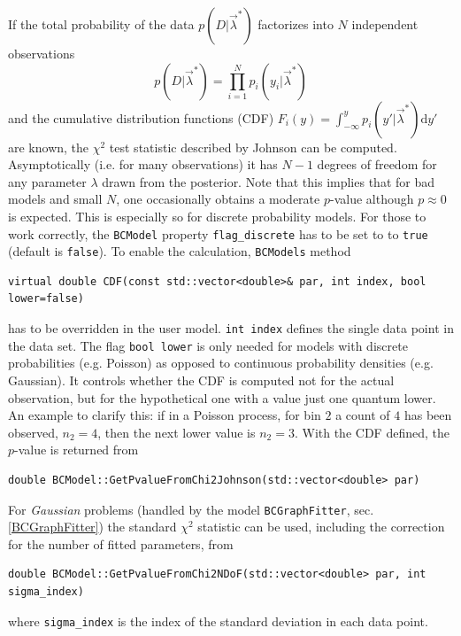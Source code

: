 \documentclass[11pt, a4paper]{article}
\begin{document}
\noindent 
If the total probability of the data $p\left(D|\vec{\lambda}^{*}\right)$
 factorizes into $N$ independent observations 
$$p\left(D|\vec{\lambda}^{*}\right) = \prod_{i=1}^N
p_i\left(y_i|\vec{\lambda}^{*}\right)$$ and the cumulative
distribution functions (CDF) $F_i(y)= \int_{-\infty}^{y}
p_i(y'|\vec{\lambda}^{*}) \mathrm{d }y'$ are known, the $\chi^2$ test
statistic described by Johnson \cite{Johnson_pValue} can be computed.
Asymptotically (i.e. for many observations) it has $N-1$ degrees of
freedom for any parameter $\lambda$ drawn from the posterior. Note
that this implies that for bad models and small $N$, one occasionally
obtains a moderate $p$-value although $p\approx 0 $ is expected. This
is especially so for discrete probability models. For those to work
correctly, the \texttt{BCModel} property \verb|flag_discrete| has to
be set to to \texttt{true} (default is \texttt{false}).  To enable the
calculation, \verb|BCModels| method
%
\begin{verbatim}
virtual double CDF(const std::vector<double>& par, int index, bool lower=false)
\end{verbatim}
%
has to be overridden in the user model.  \verb|int index| defines the
single data point in the data set. The flag \verb|bool lower| is only
needed for models with discrete probabilities (e.g. Poisson) as
opposed to continuous probability densities (e.g. Gaussian). It
controls whether the CDF is computed not for the actual observation,
but for the hypothetical one with a value just one quantum lower. An
example to clarify this: if in a Poisson process, for bin $2$ a count
of $4$ has been observed, $n_2=4$, then the next lower value is
$n_2=3$.  With the CDF defined, the $p$-value is returned from
\begin{verbatim}
double BCModel::GetPvalueFromChi2Johnson(std::vector<double> par)
\end{verbatim}

\noindent 
For \textit{Gaussian} problems (handled by the model
\verb|BCGraphFitter|, sec. \ref{BCGraphFitter}) the standard $\chi^2$
statistic can be used, including the correction for the number of
fitted parameters, from
%
\begin{verbatim}
double BCModel::GetPvalueFromChi2NDoF(std::vector<double> par, int sigma_index)
\end{verbatim}
%
where \verb|sigma_index| is the index of the standard deviation in
each data point. \\
\end{document}
